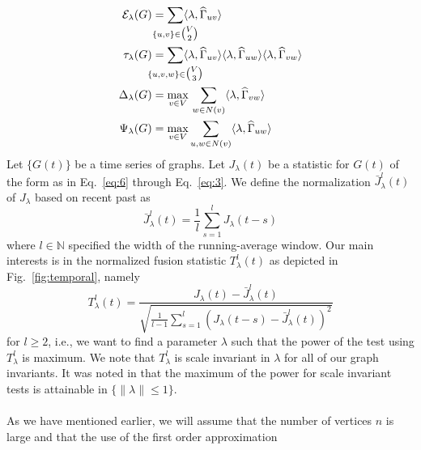 \documentclass[final]{IEEEtran}
\theoremstyle{definition}
\def\clap#1{\hbox to 0pt{\hss#1\hss}}
\def\mathclap{\mathpalette\mathclapinternal}
\def\mathclapinternal#1#2{%
\clap{$\mathsurround=0pt#1{#2}$}%
}
\begin{document}
\begin{align}
  \label{eq:6}
  \mathcal{E}_{\lambda}(G) &= \sum_{\mathclap{\{u,v\} \in
      \tbinom{V}{2}}} \langle
  \lambda, \widehat{\Gamma}_{uv} \rangle \\
  \tau_{\lambda}(G) &= \sum_{\mathclap{\{u,v,w\} \in \tbinom{V}{3}}} \langle
  \lambda, \widehat{\Gamma}_{uv} \rangle \langle \lambda,
  \widehat{\Gamma}_{uw} \rangle \langle \lambda, \widehat{\Gamma}_{vw}
  \rangle \\ 
\Delta_{\lambda}(G) &= \max_{v \in V} \, \sum_{w \in N(v)} \langle
\lambda, \widehat{\Gamma}_{vw} \rangle \\
\label{eq:3}
  \Psi_{\lambda}(G) &= \max_{v \in V} \sum_{u,w \in N(v)} \langle
  \lambda, \widehat{\Gamma}_{uw} \rangle
  \end{align}
  Let $\{G(t)\}$ be a time series of graphs. Let $J_{\lambda}(t)$ be a
  statistic for $G(t)$ of the form as in Eq.~\eqref{eq:6} through
  Eq.~\eqref{eq:3}. We define the normalization
  $\bar{J}^{l}_\lambda(t)$ of $J_{\lambda}$ based on recent past as
\begin{equation}
  \label{eq:4}
 \bar{J}^{l}_{\lambda}(t) = \frac{1}{l}\sum_{s = 1}^{l} J_{\lambda}(t - s) 
\end{equation}
where $l \in \mathbb{N}$ specified the width of the running-average
window. Our main interests is in the normalized fusion
statistic $T_{\lambda}^{l}(t)$ as depicted in Fig.~\ref{fig:temporal}, namely
\begin{equation}
  \label{eq:7}
 T_{\lambda}^{l}(t) = %
   \frac{J_{\lambda}(t) -
     \bar{J}_{\lambda}^{l}(t)}{\sqrt{\tfrac{1}{l-1}
       \sum_{s=1}^{l}(J_{\lambda}(t - s) - \bar{J}_{\lambda}^{l}(t))^2}}
\end{equation}
for $l \geq 2$, i.e., we want to find a parameter $\lambda$ such that
the power of the test using $T_{\lambda}^{l}$ is maximum. We note that
$T_{\lambda}^{l}$ is scale invariant in $\lambda$ for all of our graph
invariants. It was noted in
\cite{lee:_laten_proces_model_time_attrib_random_graph} that the
maximum of the power for scale invariant tests is
attainable in $\{ \| \lambda \| \leq 1 \}$. \\ \\
\noindent
As we have mentioned earlier, we will assume that the
number of vertices $n$ is large and that the use of the first order approximation
\end{document}
